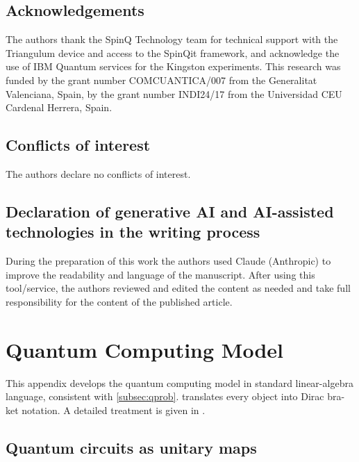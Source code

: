 \documentclass[12pt,a4paper]{article}
\theoremstyle{plain}
\theoremstyle{definition}
\theoremstyle{remark}
\begin{document}
\subsection*{Acknowledgements}

The authors thank the SpinQ Technology team for technical support with
the Triangulum device and access to the SpinQit framework,
and acknowledge the use of IBM Quantum services for the Kingston
experiments.
This research was funded by the grant number COMCUANTICA/007 from the Generalitat Valenciana, 
Spain, by the grant number INDI24/17 from the Universidad CEU Cardenal Herrera, Spain.

\subsection*{Conflicts of interest}
The authors declare no conflicts of interest.

\subsection*{Declaration of generative AI and AI-assisted technologies in the writing process}
During the preparation of this work the authors used Claude (Anthropic)
to improve the readability and language of the manuscript.
After using this tool/service, the authors reviewed and edited the
content as needed and take full responsibility for the content of the
published article.

\appendix
\section{Quantum Computing Model}
\label{app:qc}

This appendix develops the quantum computing model in standard
linear-algebra language, consistent with \cref{subsec:qprob}.
 translates every object into Dirac bra-ket notation.
A detailed treatment is given in \cite{FalcoEtAl2025,FalcoMatthies2026}.

\subsection{Quantum circuits as unitary maps}
\end{document}
